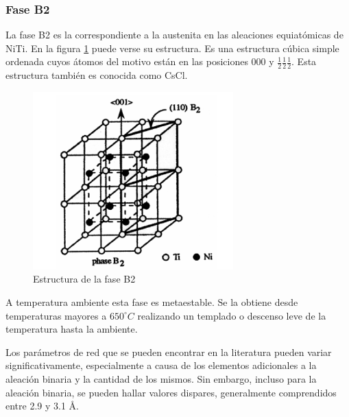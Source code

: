 \documentclass{article}
\theoremstyle{definition}
\theoremstyle{remark}
\begin{document}
\subsubsection{Fase B2}
La fase B2 es la correspondiente a la austenita en las aleaciones equiatómicas de NiTi. En la figura \ref{B2phase} puede verse su estructura. Es una estructura cúbica simple ordenada cuyos átomos del motivo están en las posiciones 000 y $\frac{1}{2}\frac{1}{2}\frac{1}{2}$. Esta estructura también es conocida como CsCl.
\begin{figure}[H]
	\centering
	\includegraphics[scale=0.4]{img/B2Phase.png}
	\caption{Estructura de la fase B2}
	\label{B2phase}
\end{figure}

A temperatura ambiente esta fase es metaestable. Se la obtiene desde temperaturas mayores a $650 ^\circ C$ realizando un templado o descenso leve de la temperatura hasta la ambiente.

Los parámetros de red que se pueden encontrar en la literatura pueden variar significativamente, especialmente a causa de los elementos adicionales a la aleación binaria y la cantidad de los mismos. Sin embargo, incluso para la aleación binaria, se pueden hallar valores dispares, generalmente comprendidos entre 2.9 y 3.1 \AA.
\end{document}
